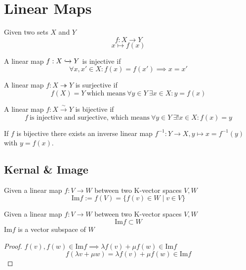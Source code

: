 \section{Linear Maps}
\begin{definition}
   Given two sets \(X\) and \(Y\)
   \[f: X \to Y\]
   \[x \mapsto f(x)\]
\end{definition}

\begin{definition}[Injective]\label{def:injective}
   A linear map \(f: X \xhookrightarrow{} Y\) is injective if
   \[\forall x, x' \in X: f(x) = f(x') \implies x = x'\]
\end{definition}

\begin{definition}[Surjective]\label{def:surjective}
   A linear map \(f: X \twoheadrightarrow Y\) is surjective if
   \[f(X) = Y~\text{which means}~\forall y \in Y~\exists x \in X: y = f(x)\]
\end{definition}

\begin{definition}[Bijective]\label{def:bijective}
   A linear map \(f: X \xrightarrow{\sim} Y\) is bijective if
   \[f~\text{is injective and surjective, which means}~\forall y \in Y~\exists! x \in X: f(x) = y\]
\end{definition}
\begin{remark}
   If \(f\) is bijective there exists an inverse linear map \(f^{-1}: Y \to X, y \mapsto x = f^{-1}(y)\) with \(y = f(x)\).
\end{remark}

\subsection{Kernal & Image}
\begin{definition}[Image]
   Given a linear map \(f: V \to W\) between two K-vector spaces \(V, W\)
   \[\text{Im}f := f(V) = \{f(v) \in W \mid v \in V\}\]
\end{definition}

\begin{proposition}
   Given a linear map \(f: V \to W\) between two K-vector spaces \(V, W\)
   \[\text{Im}f \subset W\]
   \(\text{Im}f\) is a vector subspace of \(W\)
\end{proposition}
\begin{proof}
   \(f(v), f(w) \in \text{Im}f \implies \lambda f(v) + \mu f(w) \in \text{Im}f\)
   \[f(\lambda v + \mu w) = \lambda f(v) + \mu f(w) \in \text{Im}f\]
\end{proof}

